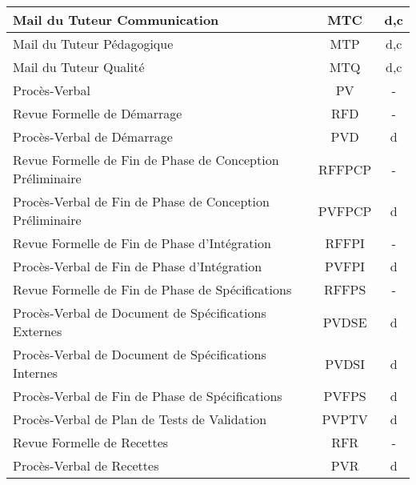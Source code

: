 \begin{longtable}{|p{12cm}|c|c|}
    \hline
    \hspace{2cm} Mail du Tuteur Communication & MTC & d,c\\
    \hline
    \hspace{2cm} Mail du Tuteur Pédagogique & MTP & d,c\\
    \hline
    \hspace{2cm} Mail du Tuteur Qualité & MTQ & d,c\\
    \hline
    \hspace{1cm} Procès-Verbal & PV & -\\
    \hline
    \hspace{2cm} Revue Formelle de Démarrage & RFD & -\\
    \hline
    \hspace{3cm} Procès-Verbal de Démarrage & PVD & d\\
    \hline
    \hspace{2cm} Revue Formelle de Fin de Phase de Conception Préliminaire & RFFPCP & -\\
    \hline
    \hspace{3cm} Procès-Verbal de Fin de Phase de Conception Préliminaire & PVFPCP & d\\
    \hline
    \hspace{2cm} Revue Formelle de Fin de Phase d'Intégration & RFFPI & -\\
    \hline
    \hspace{3cm} Procès-Verbal de Fin de Phase d'Intégration & PVFPI & d\\
    \hline
    \hspace{2cm} Revue Formelle de Fin de Phase de Spécifications & RFFPS & -\\
    \hline
    \hspace{3cm} Procès-Verbal de Document de Spécifications Externes & PVDSE & d\\
    \hline
    \hspace{3cm} Procès-Verbal de Document de Spécifications Internes & PVDSI & d\\
    \hline
    \hspace{3cm} Procès-Verbal de Fin de Phase de Spécifications & PVFPS & d\\
    \hline
    \hspace{3cm} Procès-Verbal de Plan de Tests de Validation & PVPTV & d\\
    \hline
    \hspace{2cm} Revue Formelle de Recettes & RFR & -\\
    \hline
    \hspace{3cm} Procès-Verbal de Recettes & PVR & d\\

\end{longtable}
